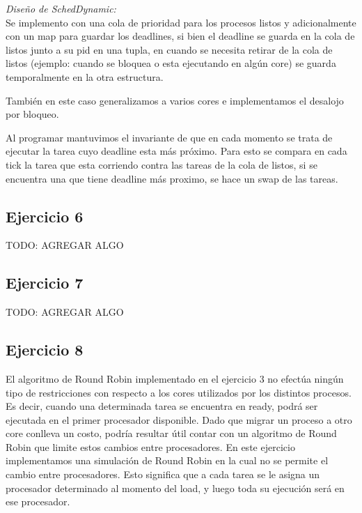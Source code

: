 \noindent
\emph{Diseño de SchedDynamic:} \\

Se implemento con una cola de prioridad para los procesos listos y adicionalmente con un map para guardar los deadlines, si bien el deadline se guarda en la cola de listos junto a su pid en una tupla, en cuando se necesita retirar de la cola de listos (ejemplo: cuando se bloquea o esta ejecutando en algún core) se guarda temporalmente en la otra estructura.

También en este caso generalizamos a varios cores e implementamos el desalojo por bloqueo.

Al programar mantuvimos el invariante de que en cada momento se trata de ejecutar la tarea cuyo deadline esta más próximo. Para esto se compara en cada tick la tarea que esta corriendo contra las tareas de la cola de listos, si se encuentra una que tiene deadline más proximo, se hace un swap de las tareas.\\


\subsection{Ejercicio 6}
TODO: AGREGAR ALGO

\subsection{Ejercicio 7}
TODO: AGREGAR ALGO

\subsection{Ejercicio 8}

El algoritmo de Round Robin implementado en el ejercicio 3 no efectúa ningún tipo de restricciones con respecto a los cores utilizados por los distintos procesos. Es decir, cuando una determinada tarea se encuentra en ready, podrá ser ejecutada en el primer procesador disponible. Dado que migrar un proceso a otro core conlleva un costo, podría resultar útil contar con un algoritmo de Round Robin que limite estos cambios entre procesadores. En este ejercicio implementamos una simulación de Round Robin en la cual no se permite el cambio entre procesadores. Esto significa que a cada tarea se le asigna un procesador determinado al momento del load, y luego toda su ejecución será en ese procesador.\\

